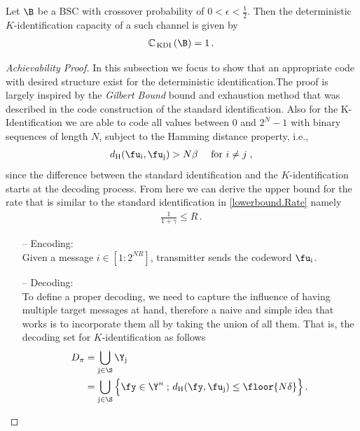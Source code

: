 \begin{theorem}
\label{Th.DKI}
Let $\B$ be a BSC with crossover probability of $0<\epsilon<\frac{1}{2}$. Then the deterministic $K$-identification capacity of a such channel is given by
\begin{align}
    \mathbb{C}_{\,\text{KDI}} \left( \B \right) = 1 \,.\,
\end{align}
\end{theorem}
\begin{proof}[Achievability Proof]
\label{Proof.Ach}
In this subsection we focus to show that an appropriate code with desired structure exist for the deterministic identification.The proof is largely  inspired by the \emph{Gilbert Bound} bound and exhaustion method that was described in the code construction of the standard identification.
Also for the K-Identification we are able to code all 
values between $0$ and $2^N-1$ with binary sequences of length $N$, subject to the Hamming distance property, i.e.,
\begin{align}
   d_{\text{H}}(\fu_{\text{i}},\fu_{\text{j}}) > N\beta \quad \text{ for } i \neq j\;,\,
\end{align}
since the difference between the standard identification and the $K$-identification starts at the decoding process. From here we can derive the upper bound for the rate that is similar to the standard identification in \eqref{lowerbound.Rate} namely 
\begin{align}
    \frac{1}{1+\gamma} \leq R \,.\,
\end{align}
\begin{itemize}
    \item [--] Encoding: \\
    Given a message $i \in [1:2^{NR}]$, transmitter sends the codeword $\fu_\text{i}$.
    \item [--] Decoding:\\
    To define a proper decoding, we need to capture the influence of having multiple target messages at hand, therefore a naive and simple idea that works is to incorporate them all by taking the union of all them. That is, the decoding set for $K$-identification as follows
    \begin{align}
        \label{Def.Dec_KDI}
        D_{\pi} & = \bigcup_{\text{j} \in \S} \Y_\text{j}
        \nonumber\\
        & = \bigcup_{\text{j} \in \S} \Big\{ \fy \in \Y^n \;;\, d_{\text{H}}(\fy,\fu_\text{j}) \leq \floor{N\delta} \Big\} \,.\,
    \end{align}

\end{itemize}
\end{proof}

